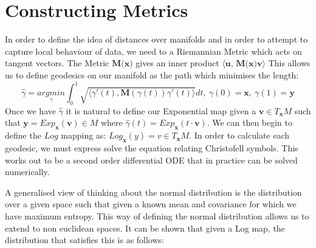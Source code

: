 \documentclass{article}
\begin{document}
\section{Constructing Metrics}
In order to define the idea of distances over manifolds and in order to attempt to capture local behaviour of data, we need to a Riemannian Metric which acts on tangent vectors.
The Metric $\textbf{M(x)}$ gives an inner product $\langle \textbf{u, M(x)v}\rangle$
This allows us to define geodesics on our manifold as the path which minimises the length:
$$\hat{\gamma} = \underset{\gamma}{argmin} \int_0^1\sqrt{\langle \gamma'(t),\textbf{M}(\gamma(t))
\gamma'(t)\rangle}dt,\: \gamma(0)=\textbf{x},\:\gamma(1)=\textbf{y}$$
Once we have $\hat{\gamma}$ it is natural to define our Exponential map given a $\textbf{v}\in T_\textbf{x}M$ such that $\textbf{y} =Exp_\textbf{x}(\textbf{v}) \in M$ where $\hat{\gamma}(t) = Exp_\textbf{x}(t\cdot\textbf{v})$.
We can then begin to define the $Log$ mapping as: $Log_\textbf{x}(y)=v\in T_\textbf{x}M$.
In order to calculate each geodesic, we must express solve the equation relating Christofell symbols.
This works out to be a second order differential ODE that in practice can be solved numerically.

A generalised view of thinking about the normal distribution is the distribution over a given space such that given a known mean and covariance for which we have maximum entropy.
This way of defining the normal distribution allows us to extend to non euclidean spaces.
It can be shown that given a Log map, the distribution that satisfies this is as follows:
\end{document}
